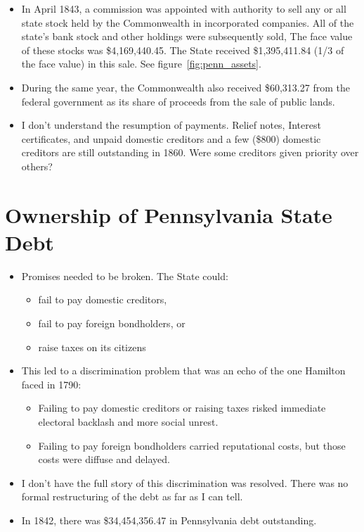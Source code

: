 \documentclass[11pt]{article}
\begin{document}
\begin{itemize}
\item In April 1843, a commission was appointed with authority to sell any or all 
state stock held by the Commonwealth in incorporated companies. All of the 
state’s bank stock and other holdings were subsequently sold, 
The face value of these stocks was \$4,169,440.45. 
The State received \$1,395,411.84 (1/3 of the face value) in this sale.  
See figure~\ref{fig:penn_assets}.

\item During the same year, the Commonwealth also received \$60,313.27 
from the federal government as its share of proceeds from the sale of public 
lands.

\item I don't understand the resumption of payments.  Relief notes,  Interest certificates, and unpaid domestic creditors
and a few (\$800) domestic creditors are still outstanding in 1860.  Were some creditors given priority over others?


\end{itemize}

\section{Ownership of Pennsylvania State Debt}

\begin{itemize}

\item Promises needed to be broken.  The State could:  
\begin{itemize}
\item fail to pay domestic creditors,
\item fail to pay foreign bondholders, or
\item raise taxes on its citizens 
\end{itemize}

\item This led to a discrimination problem that was an echo of the one Hamilton faced in 1790:
\begin{itemize}
\item Failing to pay domestic creditors or raising taxes risked immediate electoral backlash and more social unrest.

\item Failing to pay foreign bondholders carried reputational costs, but those costs were diffuse and delayed.
\end{itemize}

\item I don't have the full story of this discrimination was resolved.  There was no formal restructuring of the debt as far as I can tell.  

\item In 1842, there was \$34,454,356.47 in Pennsylvania debt outstanding.

\end{itemize}
\end{document}
